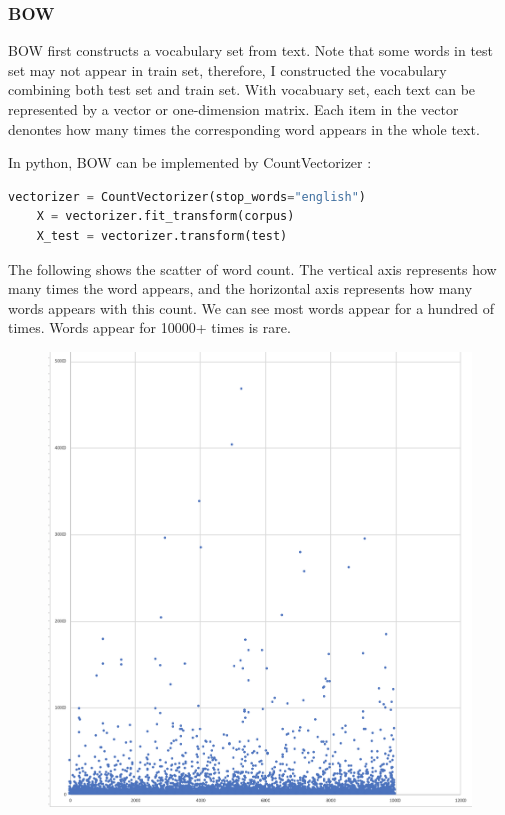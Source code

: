\documentclass[paper=a4, fontsize=11pt, UTF8]{article} %
\begin{document}
\subsubsection{BOW}
BOW first constructs a vocabulary set from text. Note that some words in test set may not appear in train set, therefore, I constructed the vocabulary combining both test set and train set. With vocabuary set, each text can be represented by a vector or one-dimension matrix. Each item in the vector denontes how many times the corresponding word appears in the whole text. 

In python, BOW can be implemented by CountVectorizer :
\begin{lstlisting}[language=python]
    vectorizer = CountVectorizer(stop_words="english")
    X = vectorizer.fit_transform(corpus)
    X_test = vectorizer.transform(test)
\end{lstlisting}

The following shows the scatter of word count. The vertical axis represents how many times the word appears,  and the horizontal axis represents how many words appears with this count. We can see most words appear for a hundred of times. Words appear for 10000+ times is rare.

\begin{figure}[H]
	\centering
	\includegraphics[scale=0.5]{./photos/frequency.png}
	\label{fig1}
\end{figure}
\end{document}
